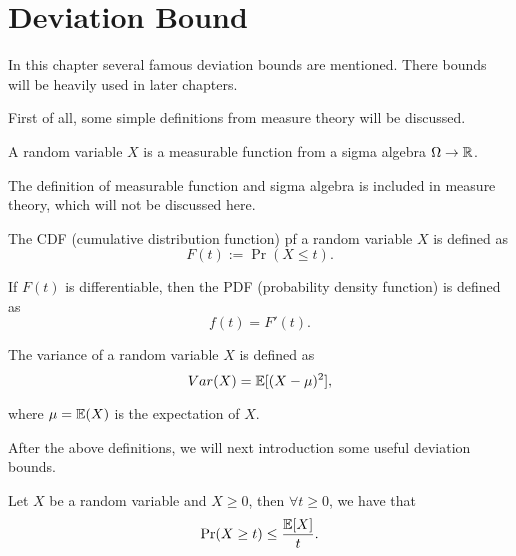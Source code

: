 \documentclass[../main.tex]{subfiles}
\begin{document}
\chapter{Deviation Bound}
In this chapter several famous deviation bounds are mentioned. There bounds will be heavily used in later chapters.

First of all, some simple definitions from measure theory will be discussed.

\begin{definition}
	A random variable $X$ is a measurable function from a sigma algebra $\Omega \to \mathbb{R}$.
\end{definition}

The definition of measurable function and sigma algebra is included in measure theory, which will not be discussed here.

\begin{definition}
	The CDF (cumulative distribution function) pf a random variable $X$ is defined as 
	\begin{equation}
		F(t) := \Pr(X \leq t).
	\end{equation}
\end{definition}

\begin{definition}
	If $F(t)$ is differentiable, then the PDF (probability density function) is defined as 
	\begin{equation}
		f(t) = F'(t).
	\end{equation}
\end{definition}

\begin{definition}
	The variance of a random variable $X$ is defined as 
	\begin{equation}
	Var(X) = \mathbb{E}[(X - \mu)^2],
	\end{equation}
	
	where $\mu = \mathbb{E}(X)$ is the expectation of $X$.
\end{definition}

After the above definitions, we will next introduction some useful deviation bounds.

\begin{theorem}
	Let $X$ be a random variable and $X \geq 0$, then $\forall t \geq 0$, we have that 
	\begin{equation}
		\Pr(X \geq t)\leq \frac{\mathbb{E}[X]}{t}.
	\end{equation}
\end{theorem}
\end{document}
